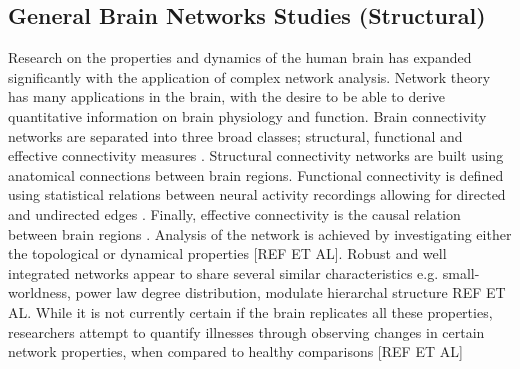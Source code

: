 \documentclass[11pt]{article}
\begin{document}
\subsection{General Brain Networks Studies (Structural)}
Research on the properties and dynamics of the human brain has expanded significantly with the application of complex network analysis. Network theory has many applications in the brain, with the desire to be able to derive quantitative information on brain physiology and function. Brain connectivity networks are separated into three broad classes; structural, functional and effective connectivity measures \citep{fornito2013graph}. Structural connectivity networks are built using anatomical connections between brain regions. Functional connectivity is defined using statistical relations between neural activity recordings allowing for directed and undirected edges \citep{friston}. Finally, effective connectivity is the causal relation between brain regions \citep{fornito2013graph}. Analysis of the network is achieved by investigating either the topological or dynamical properties [REF ET AL]. Robust and well integrated networks appear to share several similar characteristics e.g. small-worldness, power law degree distribution, modulate hierarchal structure REF ET AL. While it is not currently certain if the brain replicates all these properties, researchers attempt to quantify illnesses through observing changes in certain network properties, when compared to healthy comparisons [REF ET AL] \\
\\
\end{document}
